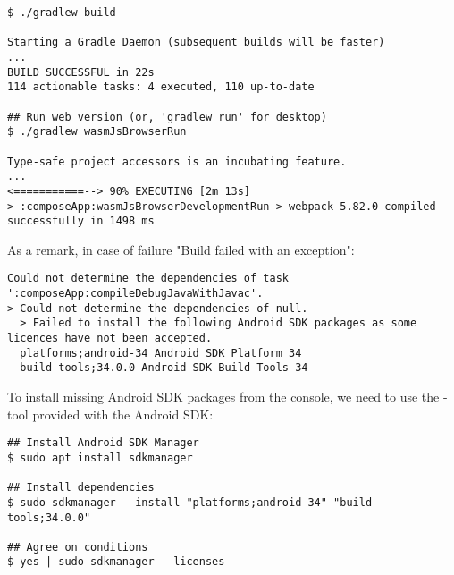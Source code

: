 \begin{lstlisting}[language=terminal]
$ ./gradlew build

Starting a Gradle Daemon (subsequent builds will be faster)
...
BUILD SUCCESSFUL in 22s
114 actionable tasks: 4 executed, 110 up-to-date

## Run web version (or, 'gradlew run' for desktop)
$ ./gradlew wasmJsBrowserRun

Type-safe project accessors is an incubating feature.
...
<===========--> 90% EXECUTING [2m 13s]
> :composeApp:wasmJsBrowserDevelopmentRun > webpack 5.82.0 compiled successfully in 1498 ms
\end{lstlisting}


\noindent As a remark, in case of failure "Build failed with an exception":
\begin{lstlisting}[language=terminal]
Could not determine the dependencies of task ':composeApp:compileDebugJavaWithJavac'.
> Could not determine the dependencies of null.
  > Failed to install the following Android SDK packages as some licences have not been accepted.
  platforms;android-34 Android SDK Platform 34
  build-tools;34.0.0 Android SDK Build-Tools 34
\end{lstlisting}

\noindent To install missing Android SDK packages from the console, we need to use the -tool 
provided with the Android SDK:

\begin{lstlisting}[language=terminal]
## Install Android SDK Manager
$ sudo apt install sdkmanager

## Install dependencies
$ sudo sdkmanager --install "platforms;android-34" "build-tools;34.0.0"

## Agree on conditions
$ yes | sudo sdkmanager --licenses
\end{lstlisting}
